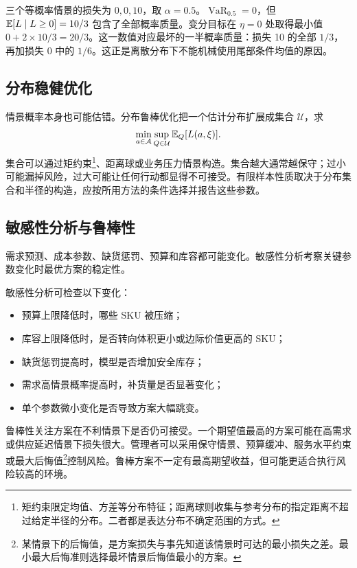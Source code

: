 \begin{example}[分位点有概率质量时]
三个等概率情景的损失为 \(0,0,10\)，取 \(\alpha=0.5\)。\(\operatorname{VaR}_{0.5}=0\)，但 \(\mathbb E[L\mid L\ge0]=10/3\) 包含了全部概率质量。变分目标在 \(\eta=0\) 处取得最小值 \(0+2\times10/3=20/3\)。这一数值对应最坏的一半概率质量：损失 10 的全部 \(1/3\)，再加损失 0 中的 \(1/6\)。这正是离散分布下不能机械使用尾部条件均值的原因。
\end{example}

\subsection{分布稳健优化}
情景概率本身也可能估错。分布鲁棒优化把一个估计分布扩展成集合 \(\mathcal U\)，求
\[
\min_{a\in\mathcal A}\sup_{Q\in\mathcal U}\mathbb E_Q[L(a,\xi)].
\]
集合可以通过矩约束\footnote{矩约束限定均值、方差等分布特征；距离球则收集与参考分布的指定距离不超过给定半径的分布。二者都是表达分布不确定范围的方式。}、距离球或业务压力情景构造。集合越大通常越保守；过小可能漏掉风险，过大可能让任何行动都显得不可接受。有限样本性质取决于分布集合和半径的构造，应按所用方法的条件选择并报告这些参数。

\subsection{敏感性分析与鲁棒性}

需求预测、成本参数、缺货惩罚、预算和库容都可能变化。敏感性分析考察关键参数变化时最优方案的稳定性。

敏感性分析可检查以下变化：
\begin{itemize}
  \item 预算上限降低时，哪些 SKU 被压缩；
  \item 库容上限降低时，是否转向体积更小或边际价值更高的 SKU；
  \item 缺货惩罚提高时，模型是否增加安全库存；
  \item 需求高情景概率提高时，补货量是否显著变化；
  \item 单个参数微小变化是否导致方案大幅跳变。
\end{itemize}

鲁棒性关注方案在不利情景下是否仍可接受。一个期望值最高的方案可能在高需求或供应延迟情景下损失很大。管理者可以采用保守情景、预算缓冲、服务水平约束或最大后悔值\footnote{某情景下的后悔值，是方案损失与事先知道该情景时可达的最小损失之差。最小最大后悔准则选择最坏情景后悔值最小的方案。}控制风险。鲁棒方案不一定有最高期望收益，但可能更适合执行风险较高的环境。

